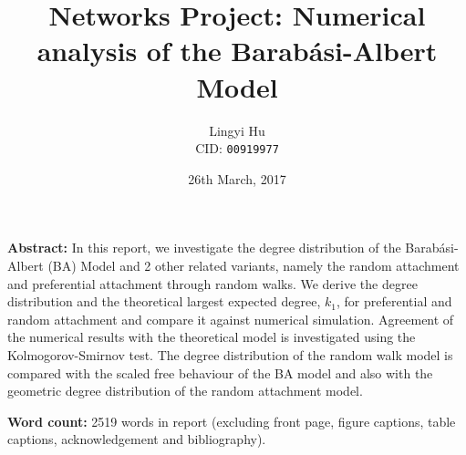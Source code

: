 


\title{Networks Project: Numerical analysis of the Barab\'asi-Albert Model}
\date{26th March, 2017}
\author{Lingyi Hu\\ CID: \texttt{00919977}}
\maketitle

\vspace*{2cm}
\noindent
{\bf Abstract:} In this report, we investigate the degree distribution of the Barab\'asi-Albert (BA) Model and 2 other related variants, namely the random attachment and preferential attachment through random walks. We derive the degree distribution and the theoretical largest expected degree, $k_1$, for preferential and random attachment and compare it against numerical simulation. Agreement of the numerical results with the theoretical model is investigated using the Kolmogorov-Smirnov test. The degree distribution of the random walk model is compared with the scaled free behaviour of the BA model and also with the geometric degree distribution of the random attachment model. 


\vspace*{2cm}
\noindent
{\bf Word count:}
2519 words in report (excluding front page, figure captions, table captions, acknowledgement and bibliography).


\newpage






\newpage
\noindent
\vspace*{2cm}

\printbibliography[heading=bibintoc]


